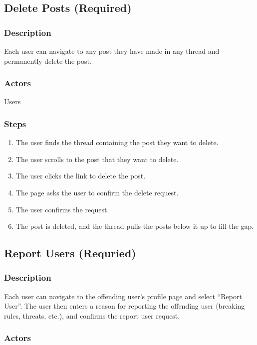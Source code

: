 \documentclass[12pt]{scrartcl}
\begin{document}
\subsection{Delete Posts (Required)}
\subsubsection{Description}

Each user can navigate to any post they have made in any thread and permanently delete the post.

\subsubsection{Actors}

Users

\subsubsection{Steps}

\begin{enumerate}
\item The user finds the thread containing the post they want to delete.
\item The user scrolls to the post that they want to delete.
\item The user clicks the link to delete the post.
\item The page asks the user to confirm the delete request.
\item The user confirms the request.
\item The post is deleted, and the thread pulls the posts below it up to fill the gap.
\end{enumerate}



\subsection{Report Users (Requried)}
\subsubsection{Description}

Each user can navigate to the offending user’s profile page and select “Report User”. The user then enters a reason for reporting the offending user (breaking rules, threats, etc.), and confirms the report user request.

\subsubsection{Actors}
\end{document}
